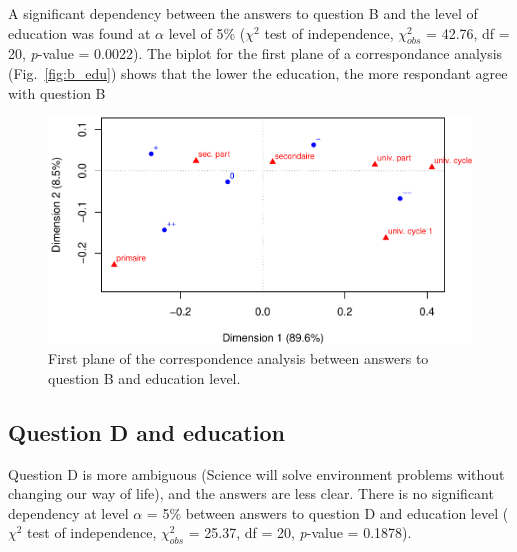\documentclass[utf8]{frontiersSCNS}
\begin{document}
A significant dependency between the answers to question B and the level
of education was found at \(\alpha\) level of 5\% (\(\chi^2\) test of
independence, \(\chi^2_{obs}\) = 42.76, df = 20, \emph{p}-value =
0.0022). The biplot for the first plane of a correspondance analysis
(Fig.~\ref{fig:b_edu}) shows that the lower the education, the more
respondant agree with question B

\begin{figure}
\includegraphics[width=1\linewidth]{perception_of_science_files/figure-latex/fig_b_edu-1} \caption{First plane of the correspondence analysis between answers to question B and education level\label{fig:b_edu}.}\label{fig:fig_b_edu}
\end{figure}

\hypertarget{question-d-and-education}{%
\subsection{Question D and education}\label{question-d-and-education}}

Question D is more ambiguous (Science will solve environment problems
without changing our way of life), and the answers are less clear. There
is no significant dependency at level \(\alpha\) = 5\% between answers
to question D and education level (\(\chi^2\) test of independence,
\(\chi^2_{obs}\) = 25.37, df = 20, \emph{p}-value = 0.1878).
\end{document}
